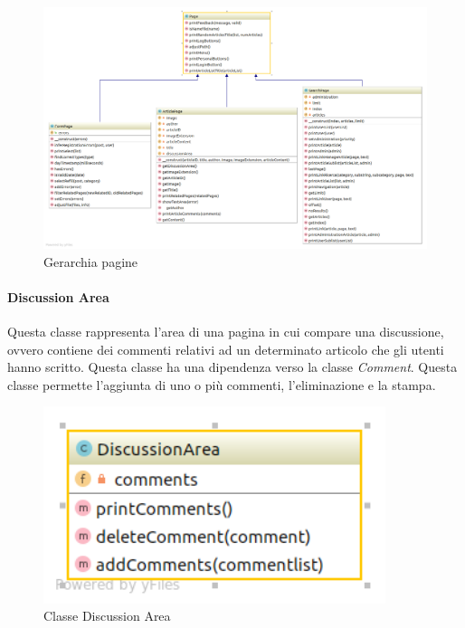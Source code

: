 \begin{figure}[H]
	\begin{center}
		\includegraphics[width=15cm]{img/Page.png}
		\caption{Gerarchia pagine}
	\end{center}
\end{figure}

\paragraph{Discussion Area} Questa classe rappresenta l'area di una pagina in cui compare una discussione, ovvero contiene dei commenti relativi ad un determinato articolo che gli utenti hanno scritto. Questa classe ha una dipendenza verso la classe \textit{Comment}. Questa classe permette l'aggiunta di uno o più commenti, l'eliminazione e la stampa.
\begin{figure}[H]
	\begin{center}
		\includegraphics[width=10cm]{img/DiscussionArea.png}
		\caption{Classe Discussion Area}
	\end{center}
\end{figure}

